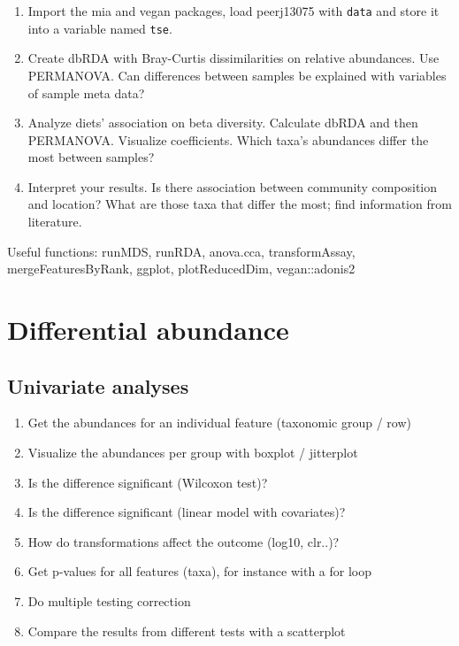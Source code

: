 \documentclass[
]{book}
\providecommand{\tightlist}{%
  \setlength{\itemsep}{0pt}\setlength{\parskip}{0pt}}
\begin{document}
\begin{enumerate}
\def\labelenumi{\arabic{enumi}.}
\tightlist
\item
  Import the mia and vegan packages, load peerj13075 with \texttt{data} and store it
  into a variable named \texttt{tse}.
\item
  Create dbRDA with Bray-Curtis dissimilarities on relative abundances. Use PERMANOVA. Can differences between samples be explained with variables of sample meta data?
\item
  Analyze diets' association on beta diversity. Calculate dbRDA and then PERMANOVA. Visualize coefficients. Which taxa's abundances differ the most between samples?
\item
  Interpret your results. Is there association between community composition and location? What are those taxa that differ the most; find information from literature.
\end{enumerate}

Useful functions: runMDS, runRDA, anova.cca, transformAssay, mergeFeaturesByRank, ggplot, plotReducedDim, vegan::adonis2

\hypertarget{differential-abundance-1}{%
\section{Differential abundance}\label{differential-abundance-1}}

\hypertarget{univariate-analyses}{%
\subsection{Univariate analyses}\label{univariate-analyses}}

\begin{enumerate}
\def\labelenumi{\arabic{enumi}.}
\tightlist
\item
  Get the abundances for an individual feature (taxonomic group / row)
\item
  Visualize the abundances per group with boxplot / jitterplot
\item
  Is the difference significant (Wilcoxon test)?
\item
  Is the difference significant (linear model with covariates)?
\item
  How do transformations affect the outcome (log10, clr..)?
\item
  Get p-values for all features (taxa), for instance with a for loop
\item
  Do multiple testing correction
\item
  Compare the results from different tests with a scatterplot
\end{enumerate}
\end{document}
